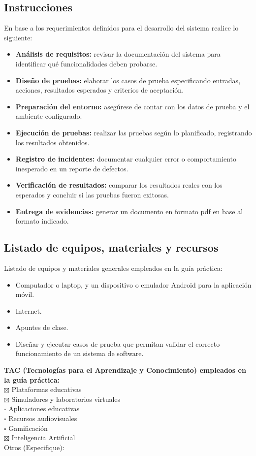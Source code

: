 \documentclass[11pt]{article}
\renewcommand{\_}{\textunderscore\allowbreak}
\begin{document}
\subsection{Instrucciones}
En base a los requerimientos definidos para el desarrollo del sistema realice lo siguiente:
\begin{itemize}
    \item \textbf{Análisis de requisitos:} revisar la documentación del sistema para identificar qué funcionalidades deben probarse.
    \item \textbf{Diseño de pruebas:} elaborar los casos de prueba especificando entradas, acciones, resultados esperados y criterios de aceptación.
    \item \textbf{Preparación del entorno:} asegúrese de contar con los datos de prueba y el ambiente configurado.
    \item \textbf{Ejecución de pruebas:} realizar las pruebas según lo planificado, registrando los resultados obtenidos.
    \item \textbf{Registro de incidentes:} documentar cualquier error o comportamiento inesperado en un reporte de defectos.
    \item \textbf{Verificación de resultados:} comparar los resultados reales con los esperados y concluir si las pruebas fueron exitosas.
    \item \textbf{Entrega de evidencias:} generar un documento en formato pdf en base al formato indicado.
\end{itemize}

\subsection{Listado de equipos, materiales y recursos}
Listado de equipos y materiales generales empleados en la guía práctica:\\
\begin{itemize}
    \item Computador o laptop, y un dispositivo o emulador Android para la aplicación móvil.
    \item Internet.
    \item Apuntes de clase.
    \item Diseñar y ejecutar casos de prueba que permitan validar el correcto funcionamiento de un sistema de software.
\end{itemize}
\textbf{TAC (Tecnologías para el Aprendizaje y Conocimiento) empleados en la guía práctica:}\\
$\boxtimes$ Plataformas educativas \\
$\boxtimes$ Simuladores y laboratorios virtuales \\
$\square$ Aplicaciones educativas \\
$\square$ Recursos audiovisuales \\
$\square$ Gamificación \\
$\boxtimes$ Inteligencia Artificial \\
Otros (Especifique): \underline{} \\
\end{document}
